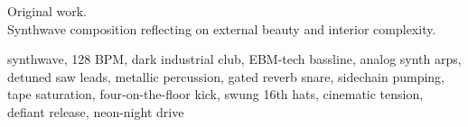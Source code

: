 

\begin{notes}
Original work.\\
Synthwave composition reflecting on external beauty and interior complexity.
\end{notes}

\begin{style}
synthwave, 128 BPM, dark industrial club, EBM-tech bassline, analog synth arps, detuned saw leads, metallic percussion, gated reverb snare, sidechain pumping, tape saturation, four-on-the-floor kick, swung 16th hats, cinematic tension, defiant release, neon-night drive
\end{style}

